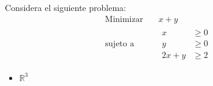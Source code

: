 \documentclass{article}
\begin{document}
Considera el siguiente problema:
\begin{equation*}
  \begin{aligned}
    \text{Minimizar}\quad & x+y \\
    \text{sujeto a}\quad  &
    \begin{aligned}
      x & \geq 0\\
      y & \geq 0\\
      2x+y & \geq 2
    \end{aligned}
  \end{aligned}
\end{equation*}

\begin{itemize}
\item $\mathbb{R}^3$
\end{itemize}
\end{document}
